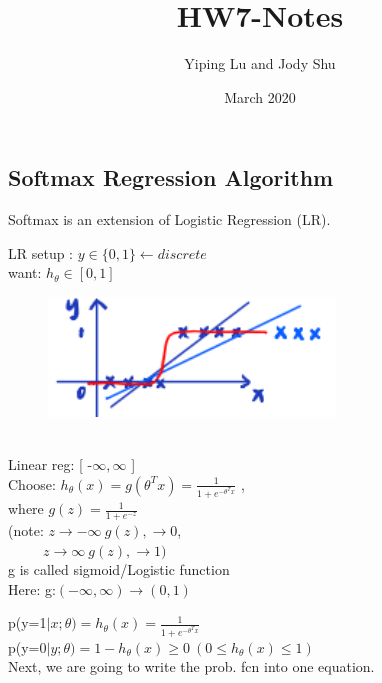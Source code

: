 \documentclass{article}
\title{HW7-Notes}
\date{March 2020}
\author{Yiping Lu and Jody Shu}
\begin{document}
\begin{Large}
\maketitle
\section{Softmax Regression Algorithm}

Softmax is an extension of Logistic Regression (LR).

LR setup : $y \in \{0,1\} \leftarrow discrete$\\
want: $h_\theta \in [0,1]$
\begin{figure}[h] %
   \centering
   \includegraphics[width=3in]{logisticRegressionPlot} 
\end{figure}
\\
Linear reg: [ -$\infty, \infty$ ]\\
Choose:  $h_\theta (x)=g(\theta^T x)= \frac{1}{1+e^{-\theta^Tx}}$ ,
\\
where $g(z)=\frac{1}{1+e^{-z}}$
\\ (note: $z\rightarrow -\infty \ g(z), \rightarrow 0$,\\
            $\hspace{30pt} z\rightarrow \infty \ g(z), \rightarrow 1)$\\
g is called sigmoid/Logistic function\\
Here: g:$(-\infty, \infty) \rightarrow (0,1)$

p(y=1$\mid x; \theta)=h_\theta (x)=\frac{1}{1+e^{-\theta ^T x}}$\\
p(y=0$\mid y; \theta)=1-h_\theta (x) \geq 0 \ (0 \leq h_\theta (x) \leq 1)$
\\
Next, we are going to write the prob. fcn into one equation.


\end{Large}
\end{document}
